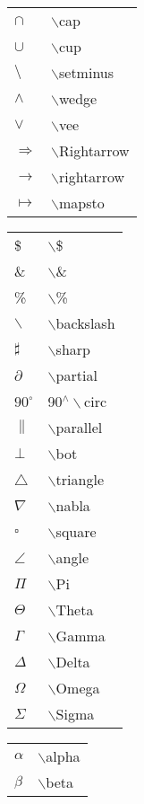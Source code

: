 \documentclass[report,oneside,UTF8,zihao=-4]{config}
\begin{document}
\begin{center}
\begin{tabular}{ll}
    $\cap $ &  $\backslash$cap \\
    $\cup $ &  $\backslash$cup \\
    $\setminus $ &  $\backslash$setminus \\
    $\wedge $ &  $\backslash$wedge \\
    $\vee $ &  $\backslash$vee \\
    $\Rightarrow$ &  $\backslash$Rightarrow \\
    $\rightarrow$ &  $\backslash$rightarrow \\
    $\mapsto$ &  $\backslash$mapsto \\
    \end{tabular}
    \hspace*{1ex}
    \begin{tabular}{ll}
    \$ & $\backslash$\$ \\
    \& & $\backslash$\& \\
    \% & $\backslash$\% \\
    $\backslash$ & $\backslash$backslash \\
    $\sharp$ & $\backslash$sharp \\
    $\partial$ &  $\backslash$partial \\
    $90^\circ$ &  90$^\wedge\backslash$circ \\
    $\parallel$ &  $\backslash$parallel \\
    $\bot$ &  $\backslash$bot \\
    $\triangle$ &  $\backslash$triangle \\
    $\nabla$ &   $\backslash$nabla \\
    $\square$ &  $\backslash$square \\
    $\angle$ &  $\backslash$angle \\
    $\Pi$ &  $\backslash$Pi \\
    $\Theta$ &  $\backslash$Theta \\
    $\Gamma$ &  $\backslash$Gamma \\
    $\Delta$ &  $\backslash$Delta \\
    $\Omega$ &  $\backslash$Omega \\
    $\Sigma$ &  $\backslash$Sigma \\
    \end{tabular}
    \hspace*{1ex}
    \begin{tabular}{ll}
    $\alpha$ &  $\backslash$alpha \\
    $\beta$ &  $\backslash$beta \\

\end{tabular}
\end{center}
\end{document}
